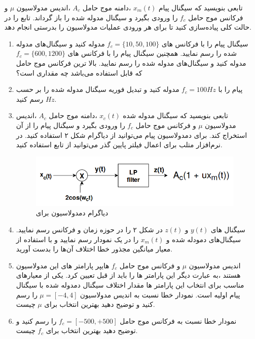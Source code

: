 \documentclass[14pt, professionalfont]{article}
\begin{document}
\begin{enumerate}
	
	تابعی بنویسید که سیگنال پیام 
	\:
	$x_m(t)$
	\:
	،دامنه موج حامل 
	\:
	$A_c$
	\:
	،اندیس مدولاسیون 
	\:
	$\mu$
	\:
	و فرکانس موج حامل 
	\:
	$f_c$
	\:
	را ورودی بگیرد و سیگنال مدوله شده را باز گرداند. تابع را در حالت کلی پیاده‌سازی کنید تا برای هر ورودی عملیات مدولاسیون را بدرستی انجام دهد.
	\begin{enumerate}
		\item
		سیگنال پیام را با فرکانس های 
		$f_c = \{10,50,100\}$
		مدوله کنید و سیگنال‌های مدوله شده را رسم نمایید. همچنین سیگنال پیام را با فرکانس های 
		$f_c = \{600 , 1200\}$
		مدوله کنید و سیگنال‌های مدوله شده را رسم نمایید. بالا ترین فرکانس موج حامل که قابل استفاده می‌باشد چه مقداری است؟‌
		\item 
		پیام را با 
		\:
		$f_c = 100 Hz$
		\:
		مدوله کنید و تبدیل فوریه سیگنال مدوله شده را بر حسب 
		$Hz$
		رسم کنید. 
		\item 
		تابعی بنویسید که سیگنال مدوله شده 
		\:
		$x_c(t)$
		\:
		،دامنه موج حامل 
		\:
		$A_c$
		\:
		،اندیس مدولاسیون 
		\:
		$\mu$
		\:
		و فرکانس موج حامل 
		\:
		$f_c$
		\:
		را ورودی بگیرد و سیگنال پیام را از آن استخراج کند. برای دمدولاسیون پیام می‌توانید از دیاگرام شکل ۲ استفاده کنید. در نرم‌افزار متلب برای اعمال فیلتر پایین گذر می‌توانید از تابع 
		\:
		\:
		استفاده کنید. 
		\begin{figure}[h]
			\centering
			\includegraphics[scale = 0.25]{../images/amdemod.png}
			\caption{
				دیاگرام دمدولاسیون برای 
			}
		\end{figure}
		\item 
		سیگنال های
		\:
		$y(t)$
		\:
		و 
		\:
		$z(t)$
		\:
		در شکل ۲ را در حوزه زمان و فرکانس رسم نمایید. سیگنال‌های  
	دمودله شده
		و
		\:
		$x_m(t)$
		\: را در یک نمودار رسم نمایید و  با استفاده از معیار میانگین مجذور خطا
		\:
		\:
		اختلاف آن‌ها را بدست آورید. 
		\item 
		اندیس مدولاسیون 
		\:
		$\mu$
		\:
		و فرکانس موج حامل 
		\:
		$f_c$
		\:
		هایپر پارامتر های این مدولاسیون هستند ،‌به عبارت دیگر این پارامتر ها را باید از قبل تعیین کرد. یکی از معیار‌های مناسب برای انتخاب این پارامتر ها مقدار اختلاف سیگنال دمدوله شده با سیگنال پیام اولیه است. نمودار خطا 
		\:
		\:
		نسبت به اندیس مدولاسیون
		\:
		$\mu = [-4,4]$
		\:
		را رسم کنید و توضیح دهید بهترین انتخاب برای 
		\:
		$\mu$
		\:
		چیست.
		\item 
		نمودار خطا 
		\:
		\:
		نسبت به فرکانس موج حامل
		\:
		$f_c = [-500 , +500]$
		\:
		را رسم کنید و توضیح دهید بهترین انتخاب برای 
		\:
		$f_c$
		\:
		چیست. 
	\end{enumerate}
	

\end{enumerate}
\end{document}
